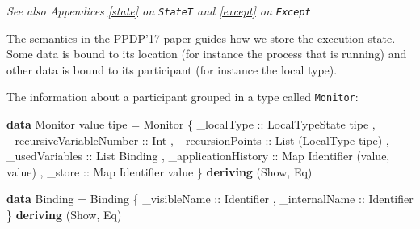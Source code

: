 \documentclass[runningheads,plain]{llncs}
\newenvironment{Shaded}{}{}
\newcommand{\KeywordTok}[1]{\textcolor[rgb]{0.00,0.44,0.13}{\textbf{#1}}}
\newcommand{\DataTypeTok}[1]{\textcolor[rgb]{0.56,0.13,0.00}{#1}}
\newcommand{\OtherTok}[1]{\textcolor[rgb]{0.00,0.44,0.13}{#1}}
\newcommand{\FunctionTok}[1]{\textcolor[rgb]{0.02,0.16,0.49}{#1}}
\newcommand{\NormalTok}[1]{#1}
\begin{document}
\emph{See also Appendices \ref{state} on \texttt{StateT} and
\ref{except} on \texttt{Except}}

The semantics in the PPDP'17 paper guides how we store the execution
state. Some data is bound to its location (for instance the process that
is running) and other data is bound to its participant (for instance the
local type).

The information about a participant grouped in a type called
\texttt{Monitor}:

\begin{Shaded}
\begin{Highlighting}[]
\KeywordTok{data} \DataTypeTok{Monitor}\NormalTok{ value tipe }\FunctionTok{=} 
    \DataTypeTok{Monitor} 
\NormalTok{        \{}\OtherTok{ _localType ::} \DataTypeTok{LocalTypeState}\NormalTok{ tipe}
\NormalTok{        ,}\OtherTok{ _recursiveVariableNumber ::} \DataTypeTok{Int}
\NormalTok{        ,}\OtherTok{ _recursionPoints ::} \DataTypeTok{List}\NormalTok{ (}\DataTypeTok{LocalType}\NormalTok{ tipe)}
\NormalTok{        ,}\OtherTok{ _usedVariables ::} \DataTypeTok{List} \DataTypeTok{Binding} 
\NormalTok{        ,}\OtherTok{ _applicationHistory ::} \DataTypeTok{Map} \DataTypeTok{Identifier}\NormalTok{ (value, value)}
\NormalTok{        ,}\OtherTok{ _store ::} \DataTypeTok{Map} \DataTypeTok{Identifier}\NormalTok{ value }
\NormalTok{        \}}
        \KeywordTok{deriving}\NormalTok{ (}\DataTypeTok{Show}\NormalTok{, }\DataTypeTok{Eq}\NormalTok{)}

\KeywordTok{data} \DataTypeTok{Binding} \FunctionTok{=} 
    \DataTypeTok{Binding} 
\NormalTok{        \{}\OtherTok{ _visibleName ::} \DataTypeTok{Identifier}
\NormalTok{        ,}\OtherTok{ _internalName ::} \DataTypeTok{Identifier} 
\NormalTok{        \}}
    \KeywordTok{deriving}\NormalTok{ (}\DataTypeTok{Show}\NormalTok{, }\DataTypeTok{Eq}\NormalTok{) }
\end{Highlighting}
\end{Shaded}
\end{document}
